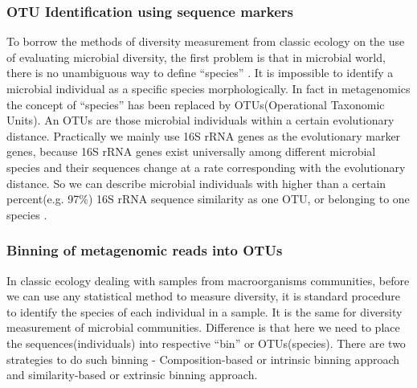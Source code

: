 \subsubsection{OTU Identification using sequence markers} To borrow the methods
of diversity measurement from classic ecology on the use of evaluating
microbial diversity, the first problem is that in microbial world, there is no
unambiguous way to define ``species'' \cite{Stackebrandt:2002aa}. It is
impossible to identify a microbial individual as a specific species
morphologically. In fact in metagenomics the concept of ``species'' has been
replaced by OTUs(Operational Taxonomic Units). An OTUs are those microbial
individuals within a certain evolutionary distance. Practically we mainly use
16S rRNA genes as the evolutionary marker genes, because 16S rRNA genes exist
universally among different microbial species and their sequences change at a
rate corresponding with the evolutionary distance. So we can describe microbial
individuals with higher than a certain percent(e.g. 97\%) 16S rRNA sequence
similarity as one OTU, or belonging to one species \cite{Schloss:2005aa}.

\subsubsection{Binning of metagenomic reads into OTUs}

In classic ecology dealing with samples from macroorganisms communities, before
we can use any statistical method to measure diversity, it is standard
procedure to identify the species of each individual in a sample. It is the
same for diversity measurement of microbial communities. Difference is that
here we need to place the sequences(individuals) into respective ``bin'' or
OTUs(species). There are two strategies to do such binning - Composition-based
or intrinsic binning approach and similarity-based or extrinsic binning
approach.

